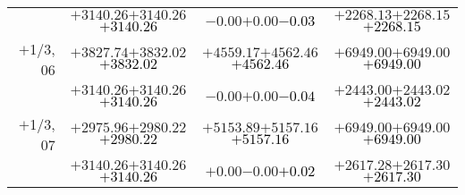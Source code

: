 \documentclass[compress]{beamer}
\begin{document}
\begin{frame}
{\begin{tabular}{r | c | c | c}
           & $+3140.26$\hspace{0.1 cm}$+3140.26$\hspace{0.1 cm}\textcolor{black}{$+3140.26$} & $-0.00$\hspace{0.1 cm}$+0.00$\hspace{0.1 cm}\textcolor{black}{$-0.03$} & $+2268.13$\hspace{0.1 cm}$+2268.15$\hspace{0.1 cm}\textcolor{black}{$+2268.15$} \\
$+$1/3, 06 & $+3827.74$\hspace{0.1 cm}$+3832.02$\hspace{0.1 cm}\textcolor{black}{$+3832.02$} & $+4559.17$\hspace{0.1 cm}$+4562.46$\hspace{0.1 cm}\textcolor{black}{$+4562.46$} & $+6949.00$\hspace{0.1 cm}$+6949.00$\hspace{0.1 cm}\textcolor{black}{$+6949.00$} \\
           & $+3140.26$\hspace{0.1 cm}$+3140.26$\hspace{0.1 cm}\textcolor{black}{$+3140.26$} & $-0.00$\hspace{0.1 cm}$+0.00$\hspace{0.1 cm}\textcolor{black}{$-0.04$} & $+2443.00$\hspace{0.1 cm}$+2443.02$\hspace{0.1 cm}\textcolor{black}{$+2443.02$} \\
$+$1/3, 07 & $+2975.96$\hspace{0.1 cm}$+2980.22$\hspace{0.1 cm}\textcolor{black}{$+2980.22$} & $+5153.89$\hspace{0.1 cm}$+5157.16$\hspace{0.1 cm}\textcolor{black}{$+5157.16$} & $+6949.00$\hspace{0.1 cm}$+6949.00$\hspace{0.1 cm}\textcolor{black}{$+6949.00$} \\
           & $+3140.26$\hspace{0.1 cm}$+3140.26$\hspace{0.1 cm}\textcolor{black}{$+3140.26$} & $+0.00$\hspace{0.1 cm}$-0.00$\hspace{0.1 cm}\textcolor{black}{$+0.02$} & $+2617.28$\hspace{0.1 cm}$+2617.30$\hspace{0.1 cm}\textcolor{black}{$+2617.30$} \\

\end{tabular}}
\end{frame}
\end{document}
